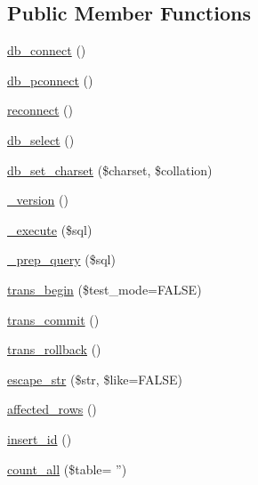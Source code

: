 \subsection*{Public Member Functions}
\begin{DoxyCompactItemize}
\item 
\hyperlink{class_c_i___d_b__cubrid__driver_a6aa545dcb7768f0b62d37cdcf7f09adc}{db\-\_\-connect} ()
\item 
\hyperlink{class_c_i___d_b__cubrid__driver_a0f69e662bd02de5bcf98647068e7c653}{db\-\_\-pconnect} ()
\item 
\hyperlink{class_c_i___d_b__cubrid__driver_a57c19c642ab3023e28d10c50f86ff0a8}{reconnect} ()
\item 
\hyperlink{class_c_i___d_b__cubrid__driver_af0c7f2602586ea2050b19fb36baefb24}{db\-\_\-select} ()
\item 
\hyperlink{class_c_i___d_b__cubrid__driver_adc8cd12121dc8edda3adcadd88a97e24}{db\-\_\-set\-\_\-charset} (\$charset, \$collation)
\item 
\hyperlink{class_c_i___d_b__cubrid__driver_ac997a462bb342f97f414910f0e033fb6}{\-\_\-version} ()
\item 
\hyperlink{class_c_i___d_b__cubrid__driver_a114ab675d89bf8324a41785fb475e86d}{\-\_\-execute} (\$sql)
\item 
\hyperlink{class_c_i___d_b__cubrid__driver_a86af88ef0fa6d44ab4691e3f53270339}{\-\_\-prep\-\_\-query} (\$sql)
\item 
\hyperlink{class_c_i___d_b__cubrid__driver_a90e153cf190d273336d77cce930587e1}{trans\-\_\-begin} (\$test\-\_\-mode=F\-A\-L\-S\-E)
\item 
\hyperlink{class_c_i___d_b__cubrid__driver_af4fbdcdace4aa94a139b64877601fe9b}{trans\-\_\-commit} ()
\item 
\hyperlink{class_c_i___d_b__cubrid__driver_a53f76d4dfcd6ac04fb653982442aeef8}{trans\-\_\-rollback} ()
\item 
\hyperlink{class_c_i___d_b__cubrid__driver_aaba16891c8c93600a87075800cc5b72b}{escape\-\_\-str} (\$str, \$like=F\-A\-L\-S\-E)
\item 
\hyperlink{class_c_i___d_b__cubrid__driver_a77248aaad33eb132c04cc4aa3f4bc8cb}{affected\-\_\-rows} ()
\item 
\hyperlink{class_c_i___d_b__cubrid__driver_a933f2cde8dc7f87875e257d0a4902e99}{insert\-\_\-id} ()
\item 
\hyperlink{class_c_i___d_b__cubrid__driver_a66111c61856499b091af32502978d4fc}{count\-\_\-all} (\$table= '')
\item 

\end{DoxyCompactItemize}
